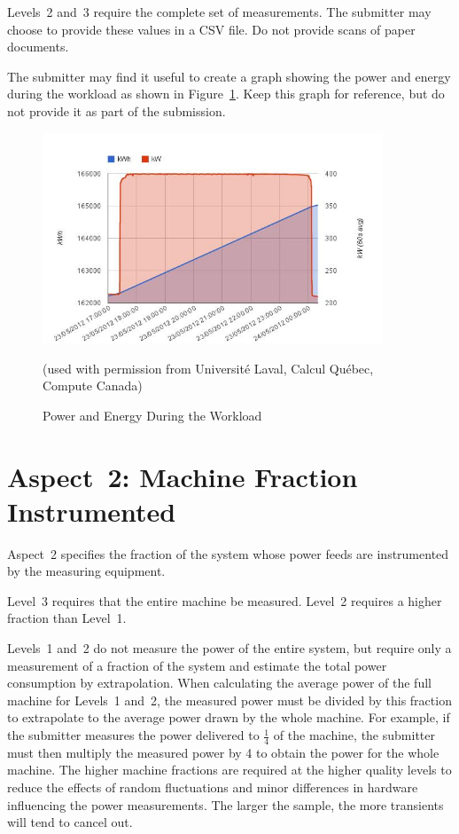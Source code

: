 Levels~2 and~3 require the complete set of measurements.
The submitter may choose to provide these values in a CSV file.
Do not provide scans of paper documents.

The submitter may find it useful to create a graph showing the power and energy during the workload as shown in Figure~\ref{fig:powengwl}.
Keep this graph for reference, but do not provide it as part of the submission.


\begin{figure}
\centering
\includegraphics[width=4in]{fig3-6}
\caption{Power and Energy During the Workload}
(used with permission from Universit\'{e} Laval, Calcul Qu\'{e}bec, Compute Canada)
\label{fig:powengwl}
\end{figure}

\section{Aspect~2: Machine Fraction Instrumented}
\label{sec:A2MFI}

Aspect~2 specifies the fraction of the system whose power feeds are instrumented by the measuring equipment.

Level~3 requires that the entire machine be measured.
Level~2 requires a higher fraction than Level~1.

Levels~1 and~2 do not measure the power of the entire system, but require only a measurement of a fraction of the system and estimate the total power consumption by extrapolation.
When calculating the average power of the full machine for Levels~1 and~2, the measured power must be divided by this fraction to extrapolate to the average power drawn by the whole machine.
For example, if the submitter measures the power delivered to $\frac{1}{4} $ of the machine, the submitter must then multiply the measured power by \num{4} to obtain the power for the whole machine.
The higher machine fractions are required at the higher quality levels to reduce the effects of random fluctuations and minor differences in hardware influencing the power measurements.
The larger the sample, the more transients will tend to cancel out.

